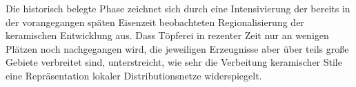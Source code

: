 Die historisch belegte Phase zeichnet sich durch eine Intensivierung der bereits in der vorangegangen späten Eisenzeit beobachteten Regionalisierung der keramischen Entwicklung aus. Dass Töpferei in rezenter Zeit nur an wenigen Plätzen noch nachgegangen wird, die jeweiligen Erzeugnisse aber über teils große Gebiete verbreitet sind, unterstreicht, wie sehr die Verbeitung keramischer Stile eine Repräsentation lokaler Distributionsnetze widerspiegelt.
